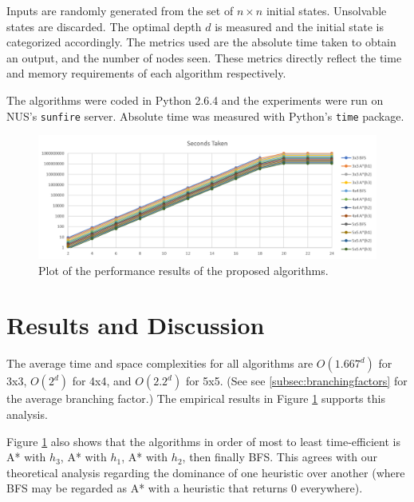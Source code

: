 \documentclass[runningheads]{llncs}
\begin{document}
Inputs are randomly generated from the set of $n \times n$ initial states. Unsolvable states are discarded. The optimal depth $d$ is measured and the initial state is categorized accordingly.
The metrics used are the absolute time taken to obtain an output, and the number of nodes seen. These metrics directly reflect the time and memory requirements of each algorithm respectively.

The algorithms were coded in Python 2.6.4 and the experiments were run on NUS's \texttt{sunfire} server. Absolute time was measured with Python's \texttt{time} package.

\begin{figure}[h!]
	\centering
	\includegraphics[width=\textwidth]{results_time.png}
	\caption{Plot of the performance results of the proposed algorithms.} \label{fig:results}
\end{figure}



\section{Results and Discussion}
The average time and space complexities for all algorithms are $O(1.667^d)$ for 3x3, $O(2^d)$ for 4x4, and $O(2.2^d)$ for 5x5. (See see \ref{subsec:branchingfactors} for the average branching factor.) The empirical results in Figure \ref{fig:results} supports this analysis.

Figure \ref{fig:results} also shows that the algorithms in order of most to least time-efficient is A* with $h_3$, A* with $h_1$, A* with $h_2$, then finally BFS. This agrees with our theoretical analysis regarding the dominance of one heuristic over another (where BFS may be regarded as A* with a heuristic that returns 0 everywhere).

\end{document}
